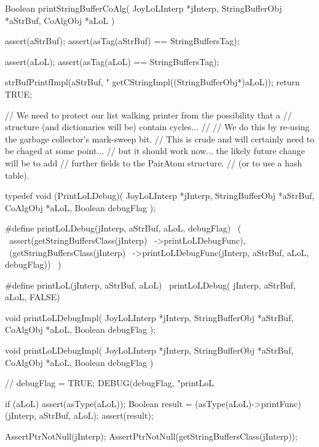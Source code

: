 \startCCode
Boolean printStringBufferCoAlg(
  JoyLoLInterp    *jInterp,
  StringBufferObj *aStrBuf,
  CoAlgObj        *aLoL
) {
  assert(aStrBuf);
  assert(asTag(aStrBuf) == StringBuffersTag);
  
  assert(aLoL);
  assert(asTag(aLoL) == StringBuffersTag);

  strBufPrintfImpl(aStrBuf, "%
    getCStringImpl((StringBufferObj*)aLoL));
  return TRUE;
}
\stopCCode

\startCCode
// We need to protect our list walking printer from the possibility that a
// structure (and dictionaries will be) contain cycles...
//
// We do this by re-using the garbage collector's mark-sweep bit.
// This is crude and will certainly need to be chaged at some point...
// but it should work now... the likely future change will be to add
// further fields to the PairAtom structure.
// (or to use a hash table).
\stopCCode

\startCHeader
typedef void (PrintLoLDebug)(
  JoyLoLInterp    *jInterp,
  StringBufferObj *aStrBuf,
  CoAlgObj        *aLoL,
  Boolean          debugFlag
);

#define printLoLDebug(jInterp, aStrBuf, aLoL, debugFlag)      \ 
  (                                                           \
    assert(getStringBuffersClass(jInterp)                     \
      ->printLoLDebugFunc),                                   \
    (getStringBuffersClass(jInterp)                           \
      ->printLoLDebugFunc(jInterp, aStrBuf, aLoL, debugFlag)) \
  )

#define printLoL(jInterp, aStrBuf, aLoL)       \
  printLoLDebug( jInterp, aStrBuf, aLoL, FALSE)
\stopCHeader

\setCHeaderStream{private}
\startCHeader
void printLoLDebugImpl(
  JoyLoLInterp    *jInterp,
  StringBufferObj *aStrBuf,
  CoAlgObj        *aLoL, 
  Boolean          debugFlag
);
\stopCHeader
{}

\startCCode
void printLoLDebugImpl(
  JoyLoLInterp    *jInterp,
  StringBufferObj *aStrBuf,
  CoAlgObj        *aLoL, 
  Boolean          debugFlag
) {
  //  debugFlag = TRUE;
  DEBUG(debugFlag, "printLoL %

  if (aLoL) {
    assert(asType(aLoL));
    Boolean result =
      (asType(aLoL)->printFunc)(jInterp, aStrBuf, aLoL);
    assert(result);
  }
}
\stopCCode
{}

\startCTest
  AssertPtrNotNull(jInterp);
  AssertPtrNotNull(getStringBuffersClass(jInterp));

